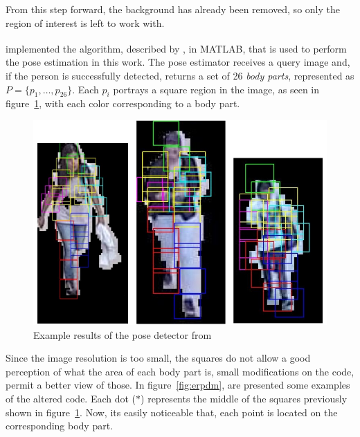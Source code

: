 \documentclass[titlepage,12pt,a4paper,times]{book}
\begin{document}
From this step forward, the background has already been removed, so only
the region of interest is left to work with.

\cite{16} implemented the algorithm, described by \cite{8}, in
MATLAB\textsuperscript{\textregistered}, that is used to perform the pose
estimation in this work.  The pose estimator receives a query image and, if the
person is successfully detected, returns a set of 26 \emph{body parts},
represented as $P=\{p_1,\hdots,p_{26}\}$. Each $p_i$ portrays a square region
in the image, as seen in figure~\ref{fig:erpd}, with each color corresponding
to a body part.

\begin{figure}[!h]
\centering
\includegraphics[scale=0.63]{images/3_3_fig1.jpg}
\caption{Example results of the pose detector from \cite{16}}
\label{fig:erpd}
\end{figure}
\FloatBarrier

Since the image resolution is too small, the squares do not allow a good
perception of what the area of each body part is, small modifications on the
code, permit a better view of those. In figure~\ref{fig:erpdm}, are presented
some examples of the altered code. Each dot ($*$) represents the middle of the
squares previously shown in figure~\ref{fig:erpd}. Now, its easily noticeable
that, each point is located on the corresponding body part.
\end{document}
